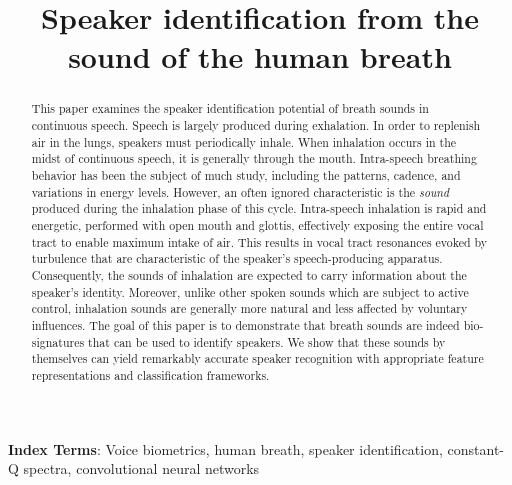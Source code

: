 \documentclass[a4paper]{article}
\title{Speaker identification from the sound of the human breath}
\begin{document}
\maketitle
% 
\begin{abstract}
This paper examines the speaker identification potential of breath sounds in continuous speech. Speech is largely produced during exhalation. In order to replenish air in the lungs, speakers must periodically inhale. When inhalation occurs in the midst of continuous speech, it is generally through the mouth. Intra-speech breathing behavior has been the subject of much study, including the patterns, cadence, and variations in energy levels. However, an often ignored characteristic is the {\em sound} produced during the inhalation phase of this cycle. Intra-speech inhalation is rapid and energetic, performed with open mouth and glottis, effectively exposing the entire vocal tract to enable maximum intake of air. This results in vocal tract resonances evoked by turbulence that are characteristic of the speaker's speech-producing apparatus. Consequently, the sounds of inhalation are expected to carry information about the speaker's identity. Moreover, unlike other spoken sounds which are subject to active control, inhalation sounds are generally more natural and less affected by voluntary influences. The goal of this paper is to demonstrate that breath sounds are indeed bio-signatures that can be used to identify speakers. We show that these sounds by themselves can yield remarkably accurate speaker recognition with appropriate feature representations and classification frameworks. 
%
%
%
\end{abstract}
\noindent\textbf{Index Terms}: Voice biometrics, human breath, speaker identification, constant-Q spectra, convolutional neural networks
\end{document}
